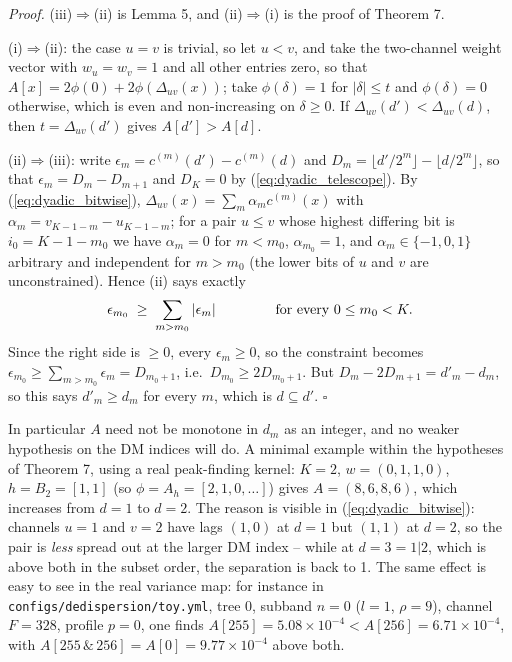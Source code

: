 \documentclass{article}
\numberwithin{equation}{section}   %
\begin{document}
\medskip
\par\noindent
{\em Proof.} (iii)$\Rightarrow$(ii) is Lemma 5, and (ii)$\Rightarrow$(i) is the proof of
Theorem 7.

(i)$\Rightarrow$(ii): the case $u=v$ is trivial, so let $u<v$, and take the two-channel weight
vector with $w_u = w_v = 1$ and all other entries zero, so that
$A[x] = 2\phi(0) + 2\phi(\Delta_{uv}(x))$; take $\phi(\delta) = 1$ for $|\delta| \le t$ and
$\phi(\delta) = 0$ otherwise, which is even and non-increasing on $\delta \ge 0$. If
$\Delta_{uv}(d') < \Delta_{uv}(d)$, then $t = \Delta_{uv}(d')$ gives $A[d'] > A[d]$.

(ii)$\Rightarrow$(iii): write $\epsilon_m = c^{(m)}(d') - c^{(m)}(d)$ and
$D_m = \lfloor d'/2^m \rfloor - \lfloor d/2^m \rfloor$, so that $\epsilon_m = D_m - D_{m+1}$
and $D_K = 0$ by (\ref{eq:dyadic_telescope}). By (\ref{eq:dyadic_bitwise}),
$\Delta_{uv}(x) = \sum_m \alpha_m c^{(m)}(x)$ with $\alpha_m = v_{K-1-m} - u_{K-1-m}$; for a
pair $u \le v$ whose highest differing bit is $i_0 = K-1-m_0$ we have $\alpha_m = 0$ for
$m<m_0$, $\alpha_{m_0}=1$, and $\alpha_m \in \{-1,0,1\}$ arbitrary and independent for
$m>m_0$ (the lower bits of $u$ and $v$ are unconstrained). Hence (ii) says exactly
\begin{equation}
\epsilon_{m_0} \;\ge\; \sum_{m>m_0} |\epsilon_m|
  \hspace{1.5cm} \mbox{for every } 0 \le m_0 < K .
\end{equation}
Since the right side is $\ge 0$, every $\epsilon_m \ge 0$, so the constraint becomes
$\epsilon_{m_0} \ge \sum_{m>m_0}\epsilon_m = D_{m_0+1}$, i.e.\ $D_{m_0} \ge 2 D_{m_0+1}$. But
$D_{m} - 2D_{m+1} = d'_{m} - d_{m}$, so this says $d'_m \ge d_m$ for every $m$, which is
$d \subseteq d'$. $\square$

\medskip
\par\noindent
In particular $A$ need not be monotone in $d_m$ as an integer, and no weaker hypothesis on the
DM indices will do. A minimal example within the hypotheses of Theorem 7, using a real
peak-finding kernel: $K=2$, $w = (0,1,1,0)$, $h = B_2 = [1,1]$ (so $\phi = A_h = [2,1,0,\dots]$)
gives $A = (8,6,8,6)$, which increases from $d=1$ to $d=2$. The reason is visible in
(\ref{eq:dyadic_bitwise}): channels $u=1$ and $v=2$ have lags $(1,0)$ at $d=1$ but $(1,1)$ at
$d=2$, so the pair is {\em less} spread out at the larger DM index -- while at $d=3 = 1|2$,
which is above both in the subset order, the separation is back to 1. The same effect is easy
to see in the real variance map: for instance in {\tt configs/dedispersion/toy.yml}, tree 0,
subband $n=0$ ($l=1$, $\rho=9$), channel $F=328$, profile $p=0$, one finds
$A[255] = 5.08\times10^{-4} < A[256] = 6.71\times10^{-4}$, with
$A[255 \,\&\, 256] = A[0] = 9.77\times10^{-4}$ above both.
\end{document}
